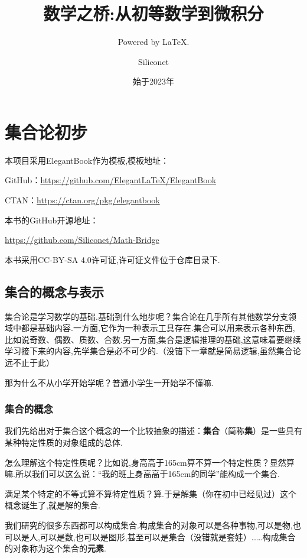 \documentclass[lang=cn,math=cm,chinesefont=nofont,11pt,scheme=chinese,twocol]{elegantbook}
\title{数学之桥:从初等数学到微积分}
\subtitle{Powered by \LaTeX.}
\author{Siliconet}
\date{始于2023年}
\begin{document}
\maketitle
\frontmatter

\tableofcontents

\mainmatter

\chapter{集合论初步}

本项目采用ElegantBook作为模板,模板地址：

GitHub：\href{https://github.com/ElegantLaTeX/ElegantBook}{https://github.com/ElegantLaTeX/ElegantBook}

CTAN：\href{https://ctan.org/pkg/elegantbook}{https://ctan.org/pkg/elegantbook}

本书的GitHub开源地址：

\href{https://github.com/Siliconet/Math-Bridge}{https://github.com/Siliconet/Math-Bridge}

本书采用CC-BY-SA 4.0许可证,许可证文件位于仓库目录下.

\section{集合的概念与表示}
集合论是学习数学的基础.基础到什么地步呢？集合论在几乎所有其他数学分支领域中都是基础内容.一方面,它作为一种表示工具存在.集合可以用来表示各种东西,比如说奇数、偶数、质数、合数.另一方面,集合是逻辑推理的基础,这意味着要继续学习接下来的内容,先学集合是必不可少的.（没错下一章就是简易逻辑,虽然集合论远不止于此）

那为什么不从小学开始学呢？普通小学生一开始学不懂嘛.

\subsection{集合的概念}

我们先给出对于集合这个概念的一个比较抽象的描述：\textbf{集合}（简称\textbf{集}）是一些具有某种特定性质的对象组成的总体.

怎么理解这个特定性质呢？比如说,身高高于165cm算不算一个特定性质？显然算嘛.所以我们可以这么说：“我的班上身高高于165cm的同学”能构成一个集合.

满足某个特定的不等式算不算特定性质？算.于是解集（你在初中已经见过）这个概念诞生了,就是解的集合.

我们研究的很多东西都可以构成集合.构成集合的对象可以是各种事物,可以是物,也可以是人,可以是数,也可以是图形,甚至可以是集合（没错就是套娃）……构成集合的对象称为这个集合的\textbf{元素}.
\end{document}
